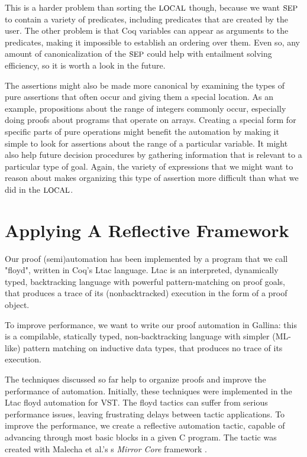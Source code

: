\documentclass{puthesis}
\begin{document}
This is a harder problem than sorting the $\mbox{\small LOCAL}$ though, because we
want $\mbox{\small SEP}$ to contain a variety of predicates, including predicates
that are created by the user. The other problem is that Coq variables
can appear as arguments to the predicates, making it impossible to
establish an ordering over them. Even so, any amount of
canonicalization of the $\mbox{\small SEP}$ could help with entailment solving
efficiency, so it is worth a look in the future. 

The assertions might also be made more canonical by examining the
types of pure assertions that often occur and giving them a special
location. As an example, propositions about the range of integers
commonly occur, especially doing proofs about programs that operate on
arrays. Creating a special form for specific parts of pure operations
might benefit the automation by making it simple to look for
assertions about the range of a particular variable. It might also
help future decision procedures by gathering information that is
relevant to a particular type of goal. Again, the variety of
expressions that we might want to reason about makes organizing this
type of assertion more difficult than what we did in the $\mbox{\small LOCAL}$. 


\chapter{Applying A Reflective Framework}
\label{ch:reflection}


Our proof (semi)automation has been implemented by a program that we
call "floyd", written in Coq's Ltac language.  Ltac is an interpreted,
dynamically typed, backtracking language with powerful
pattern-matching on proof goals, that produces a trace of its
(nonbacktracked) execution in the form of a proof object.

To improve performance, we want to write our proof automation in
Gallina: this is a compilable, statically typed, non-backtracking
language with simpler (ML-like) pattern matching on inductive data
types, that produces no trace of its execution.  

The techniques
discussed so far help to organize proofs and improve the performance
of automation. Initially, these techniques were implemented in the
Ltac floyd automation for VST. The floyd tactics can suffer from
serious performance issues, leaving frustrating delays between tactic
applications. To improve the performance, we create a reflective
automation tactic, capable of advancing through most basic blocks in a
given C program.  The tactic was created with Malecha et al.'s s
\emph{Mirror Core} framework \cite{malecha:thesis}.
\end{document}
